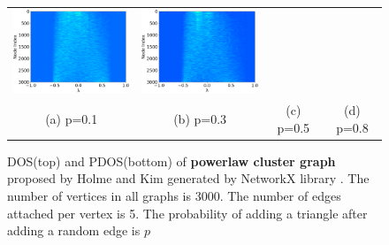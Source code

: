 \documentclass[senior,final,11pt]{iscs-thesis}
\begin{document}
\begin{figure}[htbp]
\begin{tabular}{cccc}
    \includegraphics[width=45mm]{figure/powerlaw_cluster_graph_n3000_m5_p05txt_pdos.png} &
    \includegraphics[width=45mm]{figure/powerlaw_cluster_graph_n3000_m5_p08txt_pdos.png} \\
    (a) p=0.1 & (b) p=0.3 & (c) p=0.5 & (d) p=0.8\\ [6pt]
  \end{tabular}
  \caption{DOS(top) and PDOS(bottom) of {\bf powerlaw cluster graph} proposed by Holme and Kim \cite{holme2002growing} generated by NetworkX library \cite{SciPyProceedings_11}. The number of vertices in all graphs is 3000. The number of edges attached per vertex is 5. The probability of adding a triangle after adding a random edge is $p$}
  \label{fig:powerlow_cluster}
\end{figure}
\end{document}
